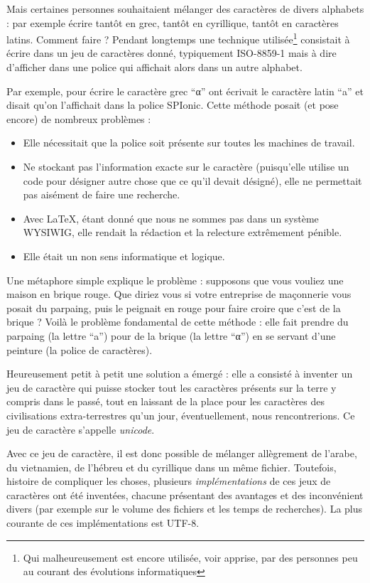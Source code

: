 Mais certaines personnes souhaitaient mélanger des caractères de divers alphabets : par exemple écrire tantôt en grec, tantôt en cyrillique, tantôt en caractères latins. Comment faire ? Pendant longtemps une technique utilisée\footnote{Qui malheureusement est encore utilisée, voir apprise, par des personnes peu au courant des évolutions informatiques} consistait à écrire dans un jeu de caractères donné, typiquement ISO-8859-1 mais à dire d'afficher dans une police qui affichait alors dans un autre alphabet. 

Par exemple, pour écrire le caractère grec \enquote{α} ont écrivait le caractère latin \enquote{a} et disait qu'on l'affichait dans la police SPIonic. Cette méthode posait (et pose encore) de nombreux problèmes :
\begin{itemize}
\item Elle nécessitait que la police soit présente sur toutes les machines de travail.
\item Ne stockant pas l'information exacte sur le caractère (puisqu'elle utilise un code pour désigner autre chose que ce qu'il devait désigné), elle ne permettait pas aisément de faire une recherche.
\item Avec \LaTeX, étant donné que nous ne sommes pas dans un système WYSIWIG, elle rendait la rédaction et la relecture extrêmement pénible.
\item Elle était un non sens informatique et logique. 
\end{itemize}

Une métaphore simple explique le problème : supposons que vous vouliez une maison en brique rouge. Que diriez vous si votre entreprise de maçonnerie vous posait du parpaing, puis le peignait en rouge pour faire croire que c'est de la brique ? Voilà le problème fondamental de cette méthode : elle fait prendre du parpaing (la lettre \enquote{a}) pour de la brique (la lettre \enquote{α}) en se servant d'une peinture (la police de caractères).

Heureusement petit à petit une solution a émergé : elle a consisté à inventer un jeu de caractère qui puisse stocker tout les caractères présents sur la terre y compris dans le passé, tout en laissant de la place pour les caractères des civilisations extra-terrestres qu'un jour, éventuellement, nous rencontrerions. Ce jeu de caractère s'appelle \emph{unicode}.

Avec ce jeu de caractère, il est donc possible de mélanger allègrement de l'arabe, du vietnamien, de l'hébreu et du cyrillique dans un même fichier. Toutefois, histoire de compliquer les choses, plusieurs \emph{implémentations} de ces jeux de caractères ont été inventées, chacune présentant des avantages et des inconvénient divers (par exemple sur le volume des fichiers et les temps de recherches). La plus courante de ces implémentations est UTF-8.

